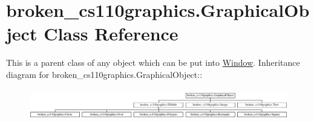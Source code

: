 \hypertarget{classbroken__cs110graphics_1_1GraphicalObject}{
\section{broken\_\-cs110graphics.GraphicalObject Class Reference}
\label{classbroken__cs110graphics_1_1GraphicalObject}
}


This is a parent class of any object which can be put into \hyperlink{classbroken__cs110graphics_1_1Window}{Window}.  
Inheritance diagram for broken\_\-cs110graphics.GraphicalObject::\begin{figure}[H]
\begin{center}
\leavevmode
\includegraphics[height=1.37143cm]{classbroken__cs110graphics_1_1GraphicalObject}
\end{center}
\end{figure}
